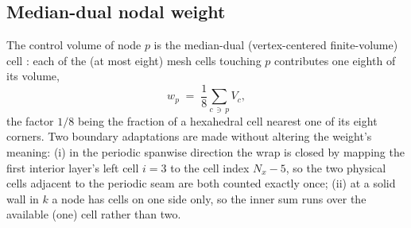 \documentclass[11pt]{article}
\theoremstyle{definition}
\theoremstyle{remark}
\begin{document}
\subsection{Median-dual nodal weight}
\label{sec:T3-weight}
The control volume of node $p$ is the median-dual (vertex-centered finite-volume)
cell \cite{Barth1991}: each of the (at most eight) mesh cells touching $p$
contributes one eighth of its volume,
\begin{equation}
w_p \;=\; \frac{1}{8}\sum_{c\,\ni\,p} V_c ,
\label{eq:median-dual}
\end{equation}
the factor $1/8$ being the fraction of a hexahedral cell nearest one of its eight
corners. Two boundary adaptations are made without altering the weight's meaning:
(i) in the periodic spanwise direction the wrap is closed by mapping the first
interior layer's left cell $i=3$ to the cell index $N_x{-}5$, so the two physical
cells adjacent to the periodic seam are both counted exactly once; (ii) at a
solid wall in $k$ a node has cells on one side only, so the inner sum runs over
the available (one) cell rather than two.
\end{document}

